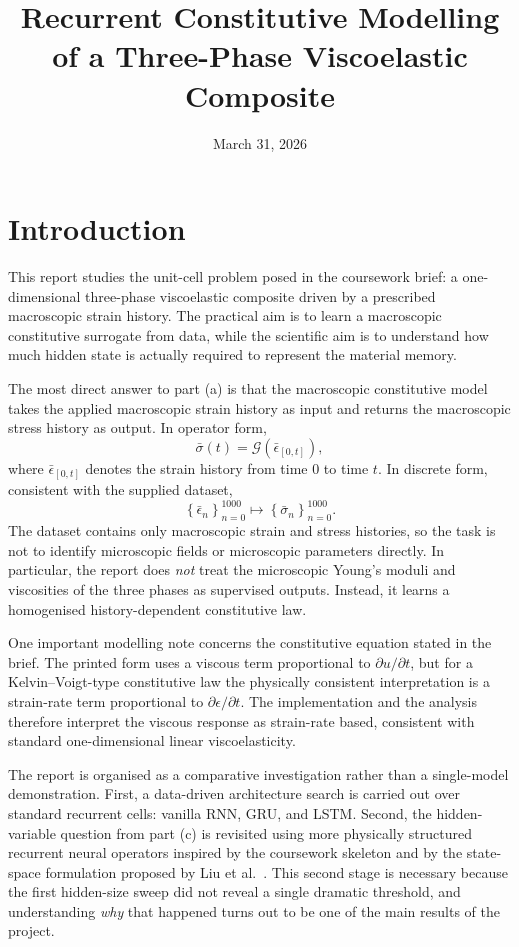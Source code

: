 \documentclass[11pt,a4paper]{article}
\title{\textbf{Recurrent Constitutive Modelling of a Three-Phase Viscoelastic Composite}}
\author{}
\date{March 31, 2026}
\newcommand{\epsbar}{\bar{\epsilon}}
\newcommand{\sigbar}{\bar{\sigma}}
\begin{document}
\maketitle

\section{Introduction}

This report studies the unit-cell problem posed in the coursework brief: a one-dimensional three-phase viscoelastic composite driven by a prescribed macroscopic strain history. The practical aim is to learn a macroscopic constitutive surrogate from data, while the scientific aim is to understand how much hidden state is actually required to represent the material memory.

The most direct answer to part (a) is that the macroscopic constitutive model takes the applied macroscopic strain history as input and returns the macroscopic stress history as output. In operator form,
\begin{equation}
\sigbar(t)=\mathcal{G}\!\left(\epsbar_{[0,t]}\right),
\label{eq:macro_operator}
\end{equation}
where $\epsbar_{[0,t]}$ denotes the strain history from time $0$ to time $t$. In discrete form, consistent with the supplied dataset,
\begin{equation}
\left\{\epsbar_n\right\}_{n=0}^{1000}\mapsto \left\{\sigbar_n\right\}_{n=0}^{1000}.
\label{eq:discrete_operator}
\end{equation}
The dataset contains only macroscopic strain and stress histories, so the task is not to identify microscopic fields or microscopic parameters directly. In particular, the report does \emph{not} treat the microscopic Young's moduli and viscosities of the three phases as supervised outputs. Instead, it learns a homogenised history-dependent constitutive law.

One important modelling note concerns the constitutive equation stated in the brief. The printed form uses a viscous term proportional to $\partial u/\partial t$, but for a Kelvin--Voigt-type constitutive law the physically consistent interpretation is a strain-rate term proportional to $\partial \epsilon/\partial t$. The implementation and the analysis therefore interpret the viscous response as strain-rate based, consistent with standard one-dimensional linear viscoelasticity.

The report is organised as a comparative investigation rather than a single-model demonstration. First, a data-driven architecture search is carried out over standard recurrent cells: vanilla RNN, GRU, and LSTM. Second, the hidden-variable question from part (c) is revisited using more physically structured recurrent neural operators inspired by the coursework skeleton and by the state-space formulation proposed by Liu et al.~\cite{Liu_2023}. This second stage is necessary because the first hidden-size sweep did not reveal a single dramatic threshold, and understanding \emph{why} that happened turns out to be one of the main results of the project.
\end{document}
